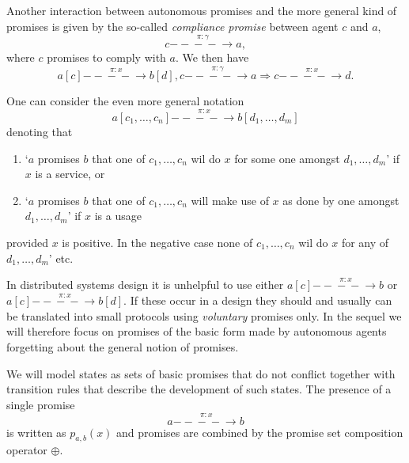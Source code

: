 \documentclass{pseudoelsart}
\newcommand{\prom}[3]{#1 \overset{\pi:#2}{- \!\!\!- \!\!\!- \!\!\!- \!\!\!\!\!\!\!\!\longrightarrow} #3}
\begin{document}
Another interaction between autonomous promises and the more general kind of promises is given by the so-called
\emph{compliance promise} between agent $c$ and $a$,
\[
\prom{c}{\gamma}{a},
\]
where $c$ promises to comply with $a$. We then have
\[
\prom{a[c]}{x}{b[d]},\prom{c}{\gamma}{a} \Longrightarrow \prom{c}{x}{d}.
\]




One can consider the even more general notation\[
\prom{a[c_1,\ldots, c_n]}{x}{b[d_1,\ldots, d_m]}
\]
denoting that 
\begin{enumerate}
\item `$a$ promises $b$ that one of $c_1, \ldots, c_n$ wil do $x$ for some one amongst $d_1, \ldots, d_m$' if $x$ is a service, or
\item `$a$ promises $b$ that one of $c_1, \ldots, c_n$ will make use of $x$ as done by one amongst $d_1, \ldots, d_m$' if $x$ is a usage
\end{enumerate}
provided $x$ is positive. In the negative case none of $c_1, \ldots, c_n$ wil do $x$ for any of $d_1, \ldots, d_m$' etc.

In distributed systems design it is unhelpful to use either $\prom{a[c]}{x}{b}$ or $\prom{a[c]}{x}{b[d]}$. If these occur in a design they should
and usually can be translated into small protocols using \emph{voluntary} promises only. In the sequel we will therefore 
focus on promises of the basic form made by autonomous agents forgetting about the general notion of promises.

We will model states as sets of basic promises that do not conflict together with
transition rules that describe the development of such states. The presence of a single promise  \[\prom{a}{x}{b}\] is written as $p_{a, b}(x)$ and promises are combined by the promise set composition operator $\oplus$.
\end{document}
